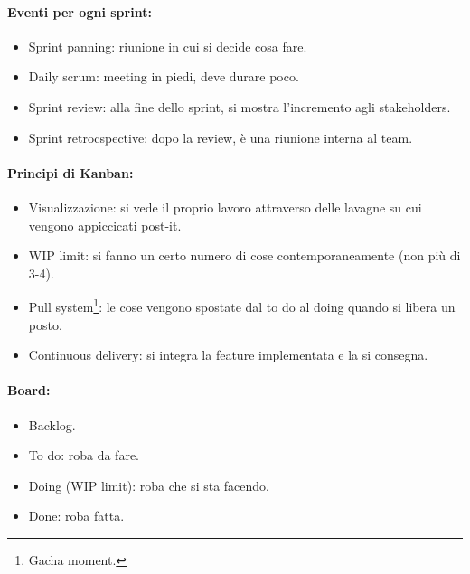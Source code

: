 \paragraph{Eventi per ogni sprint:}

\begin{itemize}
  \item Sprint panning: riunione in cui si decide cosa fare.
  \item Daily scrum: meeting in piedi, deve durare poco.
  \item Sprint review: alla fine dello sprint, si mostra l'incremento agli stakeholders.
  \item Sprint retrocspective: dopo la review, è una riunione interna al team.
\end{itemize}


\paragraph{Principi di Kanban:}

\begin{itemize}
  \item Visualizzazione: si vede il proprio lavoro attraverso delle lavagne su cui vengono appiccicati post-it.
  \item WIP limit: si fanno un certo numero di cose contemporaneamente (non più di 3-4). 
  \item Pull system\footnote{Gacha moment.}: le cose vengono spostate dal to do al doing quando si libera un posto. 
  \item Continuous delivery: si integra la feature implementata e la si consegna. 
\end{itemize}

\paragraph{Board:}

\begin{itemize}
  \item Backlog. 
  \item To do: roba da fare. 
  \item Doing (WIP limit): roba che si sta facendo. 
  \item Done: roba fatta.
\end{itemize}


